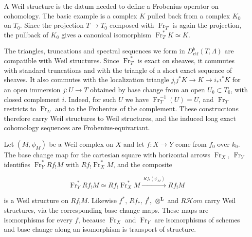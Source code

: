 \documentclass[11pt]{article}
\providecommand{\cHom}{}\renewcommand{\cHom}{R\mathcal{H}\!om}
\begin{document}
\label{bp57}%
A Weil structure is the datum needed to define a Frobenius operator on cohomology. The basic example is a complex \(K\) pulled back from a complex \(K_0\) on \(T_0\). Since the projection \(T\to T_0\) composed with \(\operatorname{Fr}_T\) is again the projection, the pullback of \(K_0\) gives a canonical isomorphism \(\operatorname{Fr}_T^*K\simeq K\).

The triangles, truncations and spectral sequences we form in \(D^b_{\mathrm{ctf}}(T,\Lambda)\) are compatible with Weil structures. Since \(\operatorname{Fr}_T^*\) is exact on sheaves, it commutes with standard truncations and with the triangle of a short exact sequence of sheaves. It also commutes with the localization triangle \(j_!j^*K\to K\to i_*i^*K\) for an open immersion \(j:U\to T\) obtained by base change from an open \(U_0\subset T_0\), with closed complement \(i\). Indeed, for such \(U\) we have \(\operatorname{Fr}_T^{-1}(U)=U\), and \(\operatorname{Fr}_T\) restricts to \(\operatorname{Fr}_U\) and to the Frobenius of the complement. These constructions therefore carry Weil structures to Weil structures, and the induced long exact cohomology sequences are Frobenius-equivariant.

Let \((M,\phi_M)\) be a Weil complex on \(X\) and let \(f:X\to Y\) come from \(f_0\) over \(k_0\). The base change map for the cartesian square with horizontal arrows \(\operatorname{Fr}_X\), \(\operatorname{Fr}_Y\) identifies \(\operatorname{Fr}_Y^*Rf_{!}M\) with \(Rf_{!}\operatorname{Fr}_X^*M\), and the composite

\[
\operatorname{Fr}_Y^*Rf_{!}M
\simeq Rf_{!}\operatorname{Fr}_X^*M
\xrightarrow{\ Rf_{!}(\phi_M)\ }Rf_{!}M
\]

is a Weil structure on \(Rf_!M\). Likewise \(f^*\), \(Rf_*\), \(f^!\), \(\otimes^{\mathbf L}\) and \(\cHom\) carry Weil structures, via the corresponding base change maps. These maps are isomorphisms for every \(f\), because \(\operatorname{Fr}_X\) and \(\operatorname{Fr}_Y\) are isomorphisms of schemes and base change along an isomorphism is transport of structure.
\end{document}
